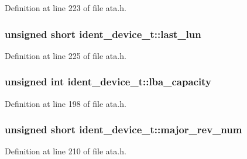 Definition at line 223 of file ata.\+h.

\subsubsection[{\texorpdfstring{last\+\_\+lun}{last_lun}}]{\setlength{\rightskip}{0pt plus 5cm}unsigned short ident\+\_\+device\+\_\+t\+::last\+\_\+lun}\hypertarget{structident__device__t_a58554aa90ee1104efe6839cd224570a0}{}\label{structident__device__t_a58554aa90ee1104efe6839cd224570a0}


Definition at line 225 of file ata.\+h.

\subsubsection[{\texorpdfstring{lba\+\_\+capacity}{lba_capacity}}]{\setlength{\rightskip}{0pt plus 5cm}unsigned int ident\+\_\+device\+\_\+t\+::lba\+\_\+capacity}\hypertarget{structident__device__t_a81cce22064b24fead62dc0b8b1a8ea3d}{}\label{structident__device__t_a81cce22064b24fead62dc0b8b1a8ea3d}


Definition at line 198 of file ata.\+h.

\subsubsection[{\texorpdfstring{major\+\_\+rev\+\_\+num}{major_rev_num}}]{\setlength{\rightskip}{0pt plus 5cm}unsigned short ident\+\_\+device\+\_\+t\+::major\+\_\+rev\+\_\+num}\hypertarget{structident__device__t_abece23d6f89f4a6baa5f961b9c265e8c}{}\label{structident__device__t_abece23d6f89f4a6baa5f961b9c265e8c}


Definition at line 210 of file ata.\+h.

